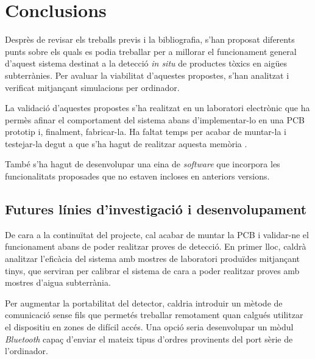 \chapter{Conclusions}\label{ch:conclusions}

Desprès de revisar els treballs previs i la bibliografia, s'han proposat diferents punts sobre els quals es podia treballar per a millorar el funcionament general d'aquest sistema destinat a la detecció \textit{in situ} de productes tòxics en aigües subterrànies. Per avaluar la viabilitat d'aquestes propostes, s'han analitzat i verificat mitjançant simulacions per ordinador.

La validació d'aquestes propostes s'ha realitzat en un laboratori electrònic que ha permès afinar el comportament del sistema abans d'implementar-lo en una \ac{PCB} prototip i, finalment, fabricar-la. Ha faltat temps per acabar de muntar-la i testejar-la degut a que s'ha hagut de realitzar aquesta memòria .

També s'ha hagut de desenvolupar una eina de \textit{software} que incorpora les funcionalitats proposades que no estaven incloses en anteriors versions.

\section{Futures línies d'investigació i desenvolupament}\label{sec:futures_linies_d'investigacio}

De cara a la continuïtat del projecte, cal acabar de muntar la \ac{PCB} i validar-ne el funcionament abans de poder realitzar proves de detecció. En primer lloc, caldrà analitzar l'eficàcia del sistema amb mostres de laboratori produïdes mitjançant tinys, que serviran per calibrar el sistema de cara a poder realitzar proves amb mostres d'aigua subterrània.

Per augmentar la portabilitat del detector, caldria introduir un mètode de comunicació sense fils que permetés treballar remotament quan calgués utilitzar el dispositiu en zones de difícil accés. Una opció seria desenvolupar un mòdul \textit{Bluetooth} capaç d'enviar el mateix tipus d'ordres provinents del port sèrie de l'ordinador.